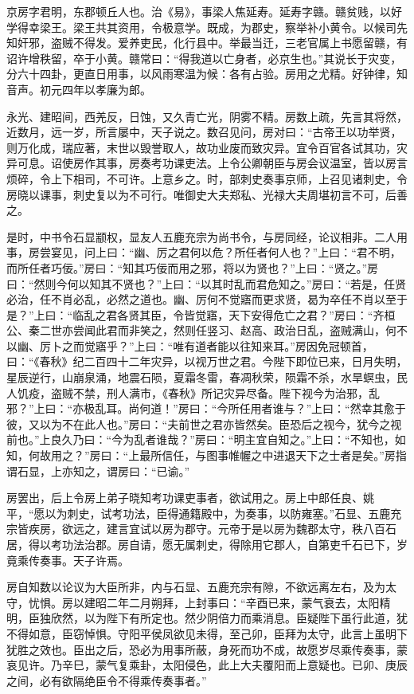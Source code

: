 \documentclass[]{article}
\begin{document}
京房字君明，东郡顿丘人也。治《易》，事梁人焦延寿。延寿字赣。赣贫贱，以好学得幸梁王。梁王共其资用，令极意学。既成，为郡史，察举补小黄令。以候司先知奸邪，盗贼不得发。爱养吏民，化行县中。举最当迁，三老官属上书愿留赣，有诏许增秩留，卒于小黄。赣常曰：``得我道以亡身者，必京生也。''其说长于灾变，分六十四卦，更直日用事，以风雨寒温为候：各有占验。房用之尤精。好钟律，知音声。初元四年以孝廉为郎。

永光、建昭间，西羌反，日蚀，又久青亡光，阴雾不精。房数上疏，先言其将然，近数月，远一岁，所言屡中，天子说之。数召见问，房对曰：``古帝王以功举贤，则万化成，瑞应著，末世以毁誉取人，故功业废而致灾异。宜令百官各试其功，灾异可息。诏使房作其事，房奏考功课吏法。上令公卿朝臣与房会议温室，皆以房言烦碎，令上下相司，不可许。上意乡之。时，部刺史奏事京师，上召见诸刺史，令房晓以课事，刺史复以为不可行。唯御史大夫郑私、光禄大夫周堪初言不可，后善之。

是时，中书令石显颛权，显友人五鹿充宗为尚书令，与房同经，论议相非。二人用事，房尝宴见，问上曰：``幽、厉之君何以危？所任者何人也？''上曰：``君不明，而所任者巧佞。''房曰：``知其巧佞而用之邪，将以为贤也？''上曰：``贤之。''房曰：``然则今何以知其不贤也？''上曰：``以其时乱而君危知之。''房曰：``若是，任贤必治，任不肖必乱，必然之道也。幽、厉何不觉寤而更求贤，曷为卒任不肖以至于是？''上曰：``临乱之君各贤其臣，令皆觉寤，天下安得危亡之君？''房曰：``齐桓公、秦二世亦尝闻此君而非笑之，然则任竖习、赵高、政治日乱，盗贼满山，何不以幽、厉卜之而觉寤乎？''上曰：``唯有道者能以往知来耳。''房因免冠顿首，曰：``《春秋》纪二百四十二年灾异，以视万世之君。今陛下即位已来，日月失明，星辰逆行，山崩泉涌，地震石陨，夏霜冬雷，春凋秋荣，陨霜不杀，水旱螟虫，民人饥疫，盗贼不禁，刑人满市，《春秋》所记灾异尽备。陛下视今为治邪，乱邪？''上曰：``亦极乱耳。尚何道！''房曰：``今所任用者谁与？''上曰：``然幸其愈于彼，又以为不在此人也。''房曰：``夫前世之君亦皆然矣。臣恐后之视今，犹今之视前也。''上良久乃曰：``今为乱者谁哉？''房曰：``明主宜自知之。''上曰：``不知也，如知，何故用之？''房曰：``上最所信任，与图事帷幄之中进退天下之士者是矣。''房指谓石显，上亦知之，谓房曰：``已谕。''

房罢出，后上令房上弟子晓知考功课吏事者，欲试用之。房上中郎任良、姚平，``愿以为刺史，试考功法，臣得通籍殿中，为奏事，以防雍塞。''石显、五鹿充宗皆疾房，欲远之，建言宜试以房为郡守。元帝于是以房为魏郡太守，秩八百石居，得以考功法治郡。房自请，愿无属刺史，得除用它郡人，自第吏千石已下，岁竟乘传奏事。天子许焉。

房自知数以论议为大臣所非，内与石显、五鹿充宗有隙，不欲远离左右，及为太守，忧惧。房以建昭二年二月朔拜，上封事曰：``辛酉已来，蒙气衰去，太阳精明，臣独欣然，以为陛下有所定也。然少阴倍力而乘消息。臣疑陛下虽行此道，犹不得如意，臣窃悼惧。守阳平侯凤欲见未得，至己卯，臣拜为太守，此言上虽明下犹胜之效也。臣出之后，恐必为用事所蔽，身死而功不成，故愿岁尽乘传奏事，蒙哀见许。乃辛巳，蒙气复乘卦，太阳侵色，此上大夫覆阳而上意疑也。已卯、庚辰之间，必有欲隔绝臣令不得乘传奏事者。''
\end{document}
